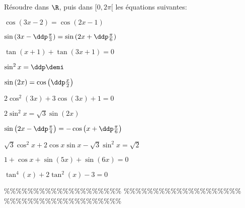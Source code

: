 



\begin{exercice}  \;
R\'esoudre dans $\R$, puis dans $\lbrack 0,2\pi\lbrack$ les \'equations suivantes:\\
\begin{enumerate}
\begin{minipage}[t]{0.45\textwidth}
\item $\cos{(3x-2)}=\cos{(2x-1)}$
\item $\sin{(3x-\ddp\frac{\pi}{3})}=\sin{(2x+\ddp\frac{\pi}{6})}$
\item $\tan{(x+1)}+\tan{(3x+1)}=0$
\item $\sin^2{x}=\ddp\demi$
\item $\sin{(2x)}=\cos{\left(\ddp\frac{x}{2}\right)}$
\end{minipage}
\begin{minipage}[t]{0.45\textwidth}
\item $2\cos^2{(3x)}+3\cos{(3x)}+1=0$
\item $2\sin^2{x}=\sqrt{3}\sin{(2x)}$ 
\item $\sin{\left(2x-\ddp\frac{\pi}{4}\right)}=-\cos{\left(x+\ddp\frac{\pi}{6}\right)}$
\item $\sqrt{3}\cos^2{x}+2\cos{x}\sin{x}-\sqrt{3}\sin^2{x}=\sqrt{2}$
\item $1+\cos{x}+\sin{(5x)}+\sin{(6x)}=0$
\item $\tan^4{(x)}+2\tan^2{(x)}-3=0$
\end{minipage}
\end{enumerate}
\end{exercice}


\%\%\%\%\%\%\%\%\%\%\%\%\%\%\%\%\%\%\%\%
\%\%\%\%\%\%\%\%\%\%\%\%\%\%\%\%\%\%\%\%
\%\%\%\%\%\%\%\%\%\%\%\%\%\%\%\%\%\%\%\%




